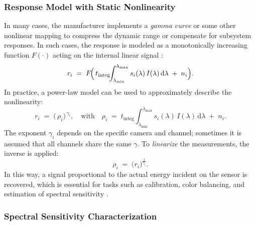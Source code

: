 \subsubsection{Response Model with Static Nonlinearity}

In many cases, the manufacturer implements a \emph{gamma curve} or some other nonlinear mapping to compress the dynamic range or compensate for subsystem responses. In such cases, the response is modeled as a monotonically increasing function $F(\cdot)$ acting on the internal linear signal \cite{Vora1997DigitalModels,Cheung2004AccurateCameras}:
\begin{equation}
r_{i} \;=\; F\!\Bigl(\,t_{\mathrm{integ}}\!\!\int_{\lambda_{\min}}^{\lambda_{\max}} s_{i}(\lambda)\,I(\lambda)\,\mathrm{d}\lambda \;+\; n_{i}\Bigr).
\label{eq:nonlinear_response}
\end{equation}
In practice, a power-law model can be used to approximately describe the nonlinearity:
\begin{equation}
r_{i} \;=\; \bigl(\,\rho_{i}\bigr)^{\,\gamma_{i}},
\quad
\text{with}
\quad
\rho_{i} \;=\; t_{\mathrm{integ}}\!\!\int_{\lambda_{\min}}^{\lambda_{\max}} s_{i}(\lambda)\,I(\lambda)\,\mathrm{d}\lambda \;+\; n_{i}.
\end{equation}
The exponent $\gamma_{i}$ depends on the specific camera and channel; sometimes it is assumed that all channels share the same $\gamma$. To \emph{linearize} the measurements, the inverse is applied:
\begin{equation}
\rho_{i} \;=\; \bigl(r_{i}\bigr)^{\frac{1}{\gamma_{i}}}.
\end{equation}
In this way, a signal proportional to the actual energy incident on the sensor is recovered, which is essential for tasks such as calibration, color balancing, and estimation of spectral sensitivity \cite{Cheung2004AccurateCameras,Uttner2006SpectralCameras}.

\subsubsection{Spectral Sensitivity Characterization}


